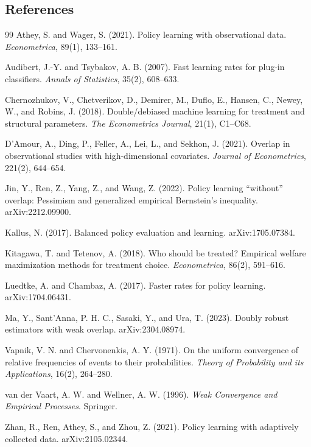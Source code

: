 \documentclass[11pt]{article}
\theoremstyle{definition}
\theoremstyle{plain}
\theoremstyle{remark}
\begin{document}
\subsection*{References}
\begin{thebibliography}{99}
Athey, S. and Wager, S. (2021).
Policy learning with observational data.
\emph{Econometrica}, 89(1), 133--161.

Audibert, J.-Y. and Tsybakov, A. B. (2007).
Fast learning rates for plug-in classifiers.
\emph{Annals of Statistics}, 35(2), 608--633.

Chernozhukov, V., Chetverikov, D., Demirer, M., Duflo, E., Hansen, C.,
Newey, W., and Robins, J. (2018).
Double/debiased machine learning for treatment and structural parameters.
\emph{The Econometrics Journal}, 21(1), C1--C68.

D'Amour, A., Ding, P., Feller, A., Lei, L., and Sekhon, J. (2021).
Overlap in observational studies with high-dimensional covariates.
\emph{Journal of Econometrics}, 221(2), 644--654.

Jin, Y., Ren, Z., Yang, Z., and Wang, Z. (2022).
Policy learning ``without'' overlap: Pessimism and generalized empirical
Bernstein's inequality.
arXiv:2212.09900.

Kallus, N. (2017).
Balanced policy evaluation and learning.
arXiv:1705.07384.

Kitagawa, T. and Tetenov, A. (2018).
Who should be treated? Empirical welfare maximization methods for treatment
choice.
\emph{Econometrica}, 86(2), 591--616.

Luedtke, A. and Chambaz, A. (2017).
Faster rates for policy learning.
arXiv:1704.06431.

Ma, Y., Sant'Anna, P. H. C., Sasaki, Y., and Ura, T. (2023).
Doubly robust estimators with weak overlap.
arXiv:2304.08974.

Vapnik, V. N. and Chervonenkis, A. Y. (1971).
On the uniform convergence of relative frequencies of events to their
probabilities.
\emph{Theory of Probability and its Applications}, 16(2), 264--280.

van der Vaart, A. W. and Wellner, A. W. (1996).
\emph{Weak Convergence and Empirical Processes}.
Springer.

Zhan, R., Ren, Athey, S., and Zhou, Z. (2021).
Policy learning with adaptively collected data.
arXiv:2105.02344.
\end{thebibliography}
\end{document}
